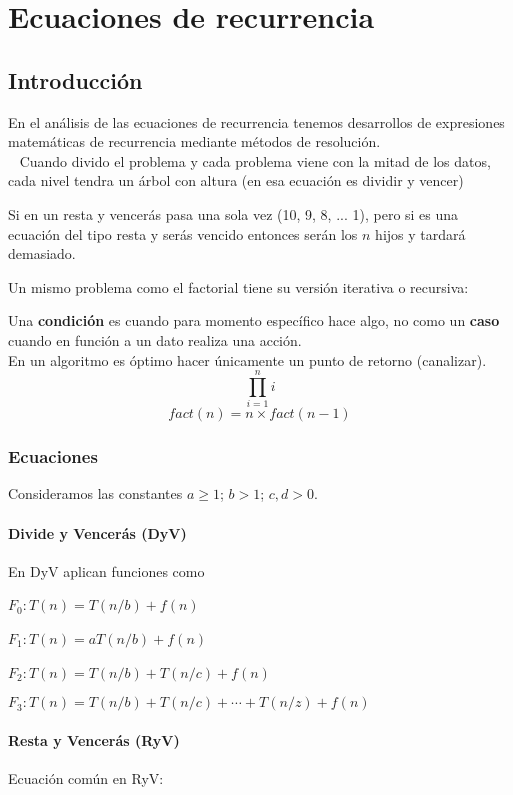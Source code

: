 \chapter{Ecuaciones de recurrencia}

\section{Introducción}
En el análisis de las ecuaciones de recurrencia tenemos desarrollos de expresiones matemáticas de recurrencia mediante métodos de resolución.
\\~
Cuando divido el problema y cada problema viene con la mitad de los datos, cada nivel tendra un árbol con altura (en esa ecuación es dividir y vencer)

Si en un resta y vencerás pasa una sola vez (10, 9, 8, ... 1), pero si es una ecuación del tipo resta y serás vencido entonces serán los $n$ hijos y tardará demasiado.

Un mismo problema como el factorial tiene su versión iterativa o recursiva:

Una \textbf{condición} es cuando para momento específico hace algo, no como un \textbf{caso} cuando en función a un dato realiza una acción.
\\
En un algoritmo es óptimo hacer únicamente un punto de retorno (canalizar).
\\

$$
	\prod_{i=1}^ni
$$
$$
	fact(n)=n\times fact(n-1)
$$

\subsection{Ecuaciones}
Consideramos las constantes \( a \ge 1 \); \( b > 1 \); \( c, d > 0 \).

\subsubsection{Divide y Vencerás (DyV)}
En DyV aplican funciones como

\( F_0 : T(n) = T(n/b) + f(n) \) \

\( F_1 : T(n) = aT(n/b) + f(n) \) \

\( F_2 : T(n) = T(n/b) + T(n/c) + f(n) \) \

\( F_3 : T(n) = T(n/b) + T(n/c) + \cdots + T(n/z) + f(n) \)

\subsubsection{Resta y Vencerás (RyV)}
Ecuación común en RyV:

